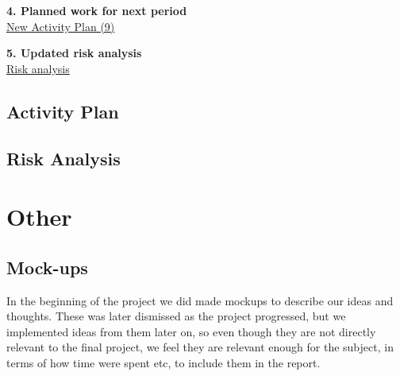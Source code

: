 \documentclass[12pt,a4paper,titlepage]{article}
\begin{document}
\begin{appendices}
\textbf{4. Planned work for next period}\\

\href{https://docs.google.com/spreadsheet/ccc?key=0AqgF_sCiXohadDQ4SlZKTTZ1ZWZ6djF2dllaZGRPSGc&usp=drive_web#gid=0}{New Activity Plan (9)}

\textbf{5. Updated risk analysis}\\

\href{https://docs.google.com/spreadsheet/ccc?key=0AlhGbQmvU9bddGs0M0tBd3ZaNUxvMnBaQnNLb0FoWnc&usp=drive_web#gid=0}{Risk analysis}

\clearpage

\subsection{Activity Plan}

\subsection{Risk Analysis}





\section{Other}

\subsection{Mock-ups}
\label{sec:mockups}

In the beginning of the project we did made mockups to describe our ideas and thoughts. These was later dismissed as the project progressed, but we implemented ideas from them later on, so even though they are not directly relevant to the final project, we feel they are relevant enough for the subject, in terms of how time were spent etc, to include them in the report.


\end{appendices}
\end{document}
